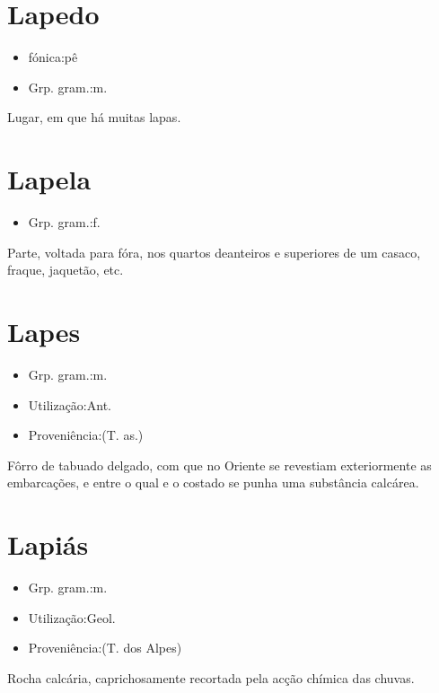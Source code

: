 \section{Lapedo}
\begin{itemize}
\item {fónica:pê}
\end{itemize}
\begin{itemize}
\item {Grp. gram.:m.}
\end{itemize}
Lugar, em que há muitas lapas.
\section{Lapela}
\begin{itemize}
\item {Grp. gram.:f.}
\end{itemize}
Parte, voltada para fóra, nos quartos deanteiros e superiores de um casaco, fraque, jaquetão, etc.
\section{Lapes}
\begin{itemize}
\item {Grp. gram.:m.}
\end{itemize}
\begin{itemize}
\item {Utilização:Ant.}
\end{itemize}
\begin{itemize}
\item {Proveniência:(T. as.)}
\end{itemize}
Fôrro de tabuado delgado, com que no Oriente se revestiam exteriormente as embarcações, e entre o qual e o costado se punha uma substância calcárea.
\section{Lapiás}
\begin{itemize}
\item {Grp. gram.:m.}
\end{itemize}
\begin{itemize}
\item {Utilização:Geol.}
\end{itemize}
\begin{itemize}
\item {Proveniência:(T. dos Alpes)}
\end{itemize}
Rocha calcária, caprichosamente recortada pela acção chímica das chuvas.
